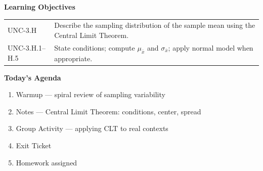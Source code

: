 \documentclass[10pt]{article}
\begin{document}
\namedateperiod

\begin{objectivebox}
\textbf{Learning Objectives}

\medskip
\begin{tabularx}{\linewidth}{@{} l X @{}}
UNC-3.H & Describe the sampling distribution of the sample mean using the Central Limit Theorem.\\[4pt]
UNC-3.H.1–H.5 & State conditions; compute $\mu_{\bar{x}}$ and $\sigma_{\bar{x}}$; apply normal model when appropriate.\\
\end{tabularx}
\end{objectivebox}

\begin{tocbox}
\textbf{Today's Agenda}
\begin{enumerate}
  \item Warmup — spiral review of sampling variability
  \item Notes — Central Limit Theorem: conditions, center, spread
  \item Group Activity — applying CLT to real contexts
  \item Exit Ticket
  \item Homework assigned
\end{enumerate}
\end{tocbox}
\end{document}
